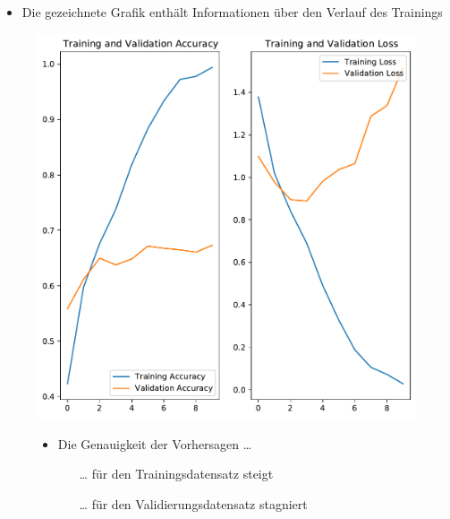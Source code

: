 \documentclass[t]{beamer}
\begin{document}
\begin{frame}
    \begin{itemize}
        \item Die gezeichnete Grafik enthält Informationen über den Verlauf des Trainings
    \end{itemize}
    \begin{figure}
        \begin{minipage}{0.5\textwidth}
            \includegraphics[width=\textwidth]{./teach-plots/pre_augmentation.pdf}
        \end{minipage}\hfill
        \begin{minipage}{0.5\textwidth}
            \begin{itemize}
                \item Die Genauigkeit der Vorhersagen \ldots
                \begin{itemize}
                    \item[\ldots] für den Trainingsdatensatz steigt
                    \item[\ldots] für den Validierungsdatensatz stagniert
                \end{itemize}
            \end{itemize}
        \end{minipage}
    \end{figure}
\end{frame}
\end{document}

